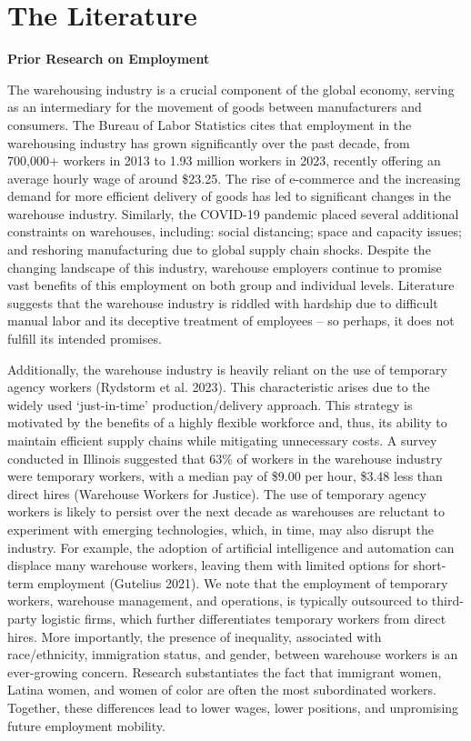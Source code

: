 \documentclass[11pt]{article}
\begin{document}
\section{The Literature}
\begin{text}

\begin{center}
    \textbf{Prior Research on Employment}
\end{center} 

\-\hspace{0.5cm} The warehousing industry is a crucial component of the global economy, serving as an intermediary for the movement of goods between manufacturers and consumers. The Bureau of Labor Statistics cites that employment in the warehousing industry has grown significantly over the past decade, from 700,000+ workers in 2013 to 1.93 million workers in 2023, recently offering an average hourly wage of around \$23.25. The rise of e-commerce and the increasing demand for more efficient delivery of goods has led to significant changes in the warehouse industry. Similarly, the COVID-19 pandemic placed several additional constraints on warehouses, including: social distancing; space and capacity issues; and reshoring manufacturing due to global supply chain shocks. Despite the changing landscape of this industry, warehouse employers continue to promise vast benefits of this employment on both group and individual levels. Literature suggests that the warehouse industry is riddled with hardship due to difficult manual labor and its deceptive treatment of employees -- so perhaps, it does not fulfill its intended promises.

\-\hspace{0.5cm} Additionally, the warehouse industry is heavily reliant on the use of temporary agency workers (Rydstorm et al. 2023). This characteristic arises due to the widely used ‘just-in-time’ production/delivery approach.  This strategy is motivated by the benefits of a highly flexible workforce and, thus, its ability to maintain efficient supply chains while mitigating unnecessary costs. A survey conducted in Illinois suggested that 63\% of workers in the warehouse industry were temporary workers, with a median pay of \$9.00 per hour, \$3.48 less than direct hires (Warehouse Workers for Justice). The use of temporary agency workers is likely to persist over the next decade as warehouses are reluctant to experiment with emerging technologies, which, in time, may also disrupt the industry. For example, the adoption of artificial intelligence and automation can displace many warehouse workers, leaving them with limited options for short-term employment (Gutelius 2021). We note that the employment of temporary workers, warehouse management, and operations, is typically outsourced to third-party logistic firms, which further differentiates temporary workers from direct hires. More importantly, the presence of inequality, associated with race/ethnicity, immigration status, and gender, between warehouse workers is an ever-growing concern. Research substantiates the fact that immigrant women, Latina women, and women of color are often the most subordinated workers.  Together, these differences lead to lower wages, lower positions, and unpromising future employment mobility.


\end{text}
\end{document}
